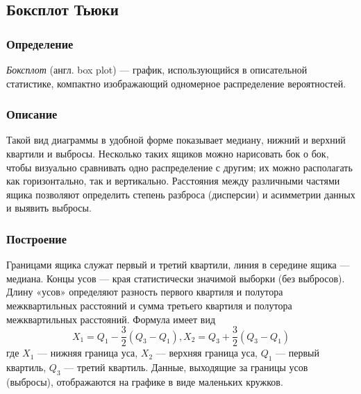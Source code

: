 \documentclass[main.tex]{subfiles}
\begin{document}
	\subsection{Боксплот Тьюки}
	
	\subsubsection{Определение}
	\noindent \textit{Боксплот} (англ. box plot) — график, использующийся в описательной статистике, компактно изображающий одномерное распределение вероятностей.

	\subsubsection{Описание}
    \noindent Такой вид диаграммы в удобной форме показывает медиану, нижний и верхний квартили и выбросы. Несколько таких ящиков можно нарисовать бок о бок, чтобы визуально сравнивать одно распределение с другим; их можно располагать как горизонтально, так и вертикально. Расстояния между различными частями ящика позволяют определить степень разброса (дисперсии) и асимметрии данных и выявить выбросы.

    \subsubsection{Построение}
    \noindent Границами ящика служат первый и третий квартили, линия в середине ящика — медиана. Концы усов — края статистически значимой выборки (без выбросов). Длину «усов» определяют разность     первого квартиля и полутора межквартильных расстояний и сумма третьего квартиля и полутора межквартильных расстояний. Формула имеет вид
    \begin{equation}\label{boxplot:mustache}
    	{X_1 = Q_1-} \frac{3}{2}{(Q_3 - Q_1)},   {X_2 = Q_3+} \frac{3}{2}{(Q_3 - Q_1)}
    \end{equation}
        где $X_1$ — нижняя граница уса, $X_2$ — верхняя граница уса, $Q_1$ — первый квартиль, $Q_3$ — третий квартиль. Данные, выходящие за границы усов (выбросы), отображаются на графике в виде маленьких кружков.
\end{document}
